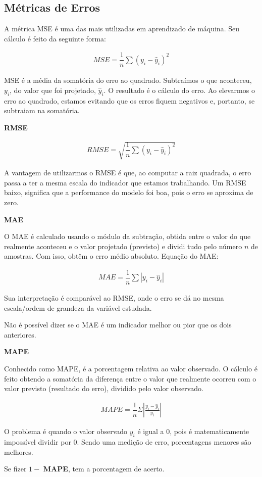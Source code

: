 \subsection{M\'etricas de Erros}\label{subsec:metrica}


A métrica MSE é uma das mais utilizadas em aprendizado de máquina. Seu cálculo é feito da seguinte forma:

\begin{eqnarray}
	M S E=\dfrac{1}{n} \sum\left(y_i-\hat{y}_i\right)^2\label{eq:mse}
\end{eqnarray}

MSE é a média da somatória do erro ao quadrado. Subtraímos o que aconteceu, $y_i$, do valor que foi projetado, $\hat{y}_i$. O resultado é o cálculo do erro. Ao elevarmos o erro ao quadrado, estamos evitando que os erros fiquem negativos e, portanto, se subtraiam na somatória.

\textbf{RMSE}

\begin{eqnarray}
	R M S E=\sqrt{\dfrac{1}{n} \sum\left(y_i-\hat{y}_i\right)^2}\label{eq:rmse}
\end{eqnarray}

A vantagem de utilizarmos o RMSE é que, ao computar a raiz quadrada, o erro passa a ter a mesma escala do indicador que estamos trabalhando. Um RMSE baixo, significa que a performance do modelo foi boa, pois o erro se aproxima de zero.

\textbf{MAE}

O MAE é calculado usando o módulo da subtração, obtida entre o valor do que realmente aconteceu e o valor projetado (previsto) e dividi tudo pelo número $n$ de amostras. Com isso, obtêm o erro médio absoluto. Equação do MAE:

\begin{eqnarray}
	M A E=\dfrac{1}{n} \sum\left|y_i-\hat{y}_i\right|\label{eq:mae}
\end{eqnarray}

Sua interpretação é comparável ao RMSE, onde o erro se dá no mesma escala/ordem de grandeza da variável estudada.

Não é possível dizer se o MAE é um indicador melhor ou pior que os dois anteriores.

\textbf{MAPE}

Conhecido como MAPE, é a porcentagem relativa ao valor observado. O cálculo é feito obtendo a somatória da diferença entre o valor que realmente ocorreu com o valor previsto (resultado do erro), dividido pelo valor observado.

\begin{eqnarray}
	M A P E=\dfrac{1}{n} \Sigma\left|\frac{y_i-\hat{y}_i}{y_i}\right|\label{eq:mape}
\end{eqnarray}

O problema é quando o valor observado $y_i$ é igual a $0$, pois é matematicamente impossível dividir por $0$. Sendo uma medição de erro, porcentagens menores são melhores.

Se fizer $1 -$ \textbf{MAPE}, tem a porcentagem de acerto.